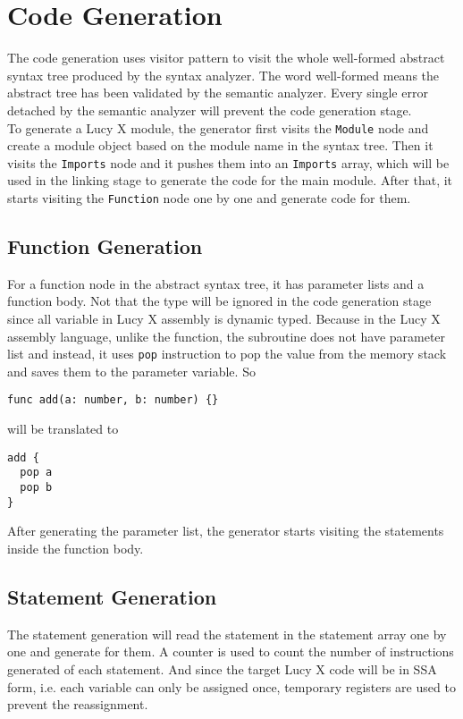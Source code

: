 \section{Code Generation}
The code generation uses visitor pattern to visit the whole well-formed abstract syntax tree produced by the syntax analyzer. The word well-formed means the abstract tree has been validated by the semantic analyzer. Every single error detached by the semantic analyzer will prevent the code generation stage. \\
To generate a Lucy X module, the generator first visits the \texttt{Module} node and create a module object based on the module name in the syntax tree. Then it visits the \texttt{Imports} node and it pushes them into an \texttt{Imports} array, which will be used in the linking stage to generate the code for the main module. After that, it starts visiting the \texttt{Function} node one by one and generate code for them. \\
\subsection{Function Generation}
For a function node in the abstract syntax tree, it has parameter lists and a function body. Not that the type will be ignored in the code generation stage since all variable in Lucy X assembly is dynamic typed. Because in the Lucy X assembly language, unlike the function, the subroutine does not have parameter list and instead, it uses \texttt{pop} instruction to pop the value from the memory stack and saves them to the parameter variable. So
\begin{lstlisting}
func add(a: number, b: number) {}
\end{lstlisting}
will be translated to
\begin{lstlisting}[language=LucyX]
add {
  pop a
  pop b
}
\end{lstlisting}
After generating the parameter list, the generator starts visiting the statements inside the function body.
\subsection{Statement Generation}
The statement generation will read the statement in the statement array one by one and generate for them. A counter is used to count the number of instructions generated of each statement. And since the target Lucy X code will be in SSA form, i.e. each variable can only be assigned once, temporary registers are used to prevent the reassignment.
